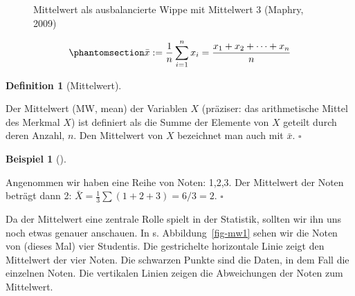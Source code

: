 \documentclass[
  letterpaper,
]{scrbook}
\theoremstyle{definition}
\theoremstyle{definition}
\newtheorem{example}{Beispiel}[chapter]
\theoremstyle{definition}
\newtheorem{definition}{Definition}[chapter]
\theoremstyle{remark}
\begin{document}
\begin{figure}


\caption{\label{fig-wippe}Mittelwert als ausbalancierte Wippe mit
Mittelwert 3 (Maphry, 2009)}

\end{figure}%

\begin{equation}\phantomsection\label{eq-mw-formel}{\bar {x} :=\frac{1}{n} \sum_{i=1}^{n}{x_{i}}=\frac {x_{1}+x_{2}+\dotsb +x_{n}} {n}}\end{equation}

\begin{definition}[Mittelwert]\protect\hypertarget{def-mw}{}\label{def-mw}

Der Mittelwert (MW, mean) der Variablen \(X\) (präziser: das
arithmetische Mittel des Merkmal \(X\)) ist definiert als die Summe der
Elemente von \(X\) geteilt durch deren Anzahl, \(n\). Den Mittelwert von
\(X\) bezeichnet man auch mit \(\bar {x}\). \(\square\)

\end{definition}

\begin{example}[]\protect\hypertarget{exm-mw1}{}\label{exm-mw1}

Angenommen wir haben eine Reihe von Noten: 1,2,3. Der Mittelwert der
Noten beträgt dann 2: \(\bar{X} = \frac{1}{3}\sum (1+2+3) = 6/3 = 2\).
\(\square\)

\end{example}

Da der Mittelwert eine zentrale Rolle spielt in der Statistik, sollten
wir ihn uns noch etwas genauer anschauen. In s. Abbildung~\ref{fig-mw1}
sehen wir die Noten von (dieses Mal) vier Studentis. Die gestrichelte
horizontale Linie zeigt den Mittelwert der vier Noten. Die schwarzen
Punkte sind die Daten, in dem Fall die einzelnen Noten. Die vertikalen
Linien zeigen die Abweichungen der Noten zum Mittelwert.
\end{document}
